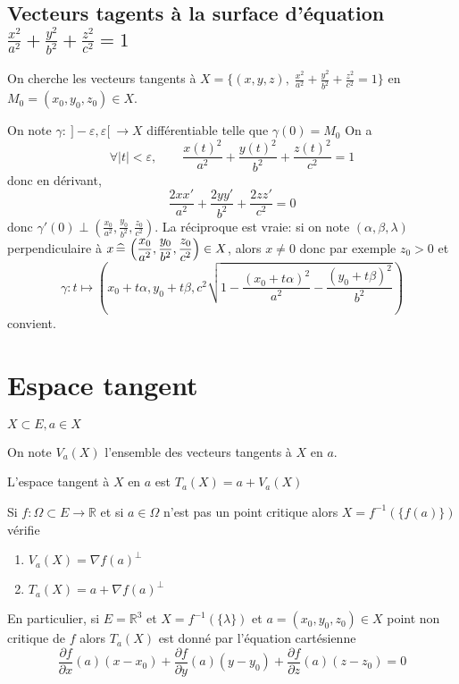 \subsection{Vecteurs tagents à la surface d'équation $\frac{x^2}{a^2}+\frac{y^2}{b^2}+\frac{z^2}{c^2}=1$}

On cherche les vecteurs tangents à $X=\{(x, y, z), \; \frac{x^2}{a^2}+\frac{y^2}{b^2}+\frac{z^2}{c^2}=1\}$ en $M_0=(x_0,y_0,z_0)\in X$.

On note $\gamma :~]-\varepsilon, \varepsilon[ ~\longrightarrow X$ différentiable telle que $\gamma(0)=M_0$
On a \[
    \forall |t|<\varepsilon, \qquad \frac{x(t)^2}{a^2} + \frac{y(t)^2}{b^2} + \frac{z(t)^2}{c^2}=1
\]
donc en dérivant, \[
    \frac{2xx'}{a^2}+ \frac{2yy'}{b^2} + \frac{2zz'}{c^2} =0
\]
donc $\displaystyle\gamma'(0)\perp \left( \frac{x_0}{a^2}, \frac{y_0}{b^2} , \frac{z_0}{c^2}   \right)$. La réciproque est vraie: si on note $(\alpha, \beta, \lambda)$ perpendiculaire à $\displaystyle x\,\widehat=\,\left( \frac{x_0}{a^2}, \frac{y_0}{b^2} , \frac{z_0}{c^2}   \right)\in X$, alors $x\neq 0$ donc par exemple $z_0>0$ et \[
    \gamma:t\longmapsto \left(x_0+t\alpha, y_0+t\beta, c^2\sqrt{1- \dfrac{(x_0+t\alpha)^2}{a^2}-\dfrac{(y_0+t\beta)^2}{b^2}}\right)
\]
convient.

\section{Espace tangent}

\begin{defprop}
    \Hyp $X\subset E, a\in X$
    \begin{concenum}
    \item On note $V_a(X)$ l'ensemble des vecteurs tangents à $X$ en $a$.
    \item L'espace tangent à $X$ en $a$ est $T_a(X)=a+V_a(X)$
    \item Si $f:\Omega \subset E\to \mathbb R$ et si $a\in \Omega$ n'est pas un point critique alors $X=f^{-1}(\{f(a)\})$ vérifie \begin{enumerate}
        \item $V_a(X)=\nabla f(a)^\perp$
        \item $T_a(X)=a+\nabla f(a)^\perp$
    \end{enumerate}
    En particulier, si $E=\mathbb R^3$ et $X=f^{-1}(\{\lambda\})$ et $a=(x_0, y_0, z_0)\in X$ point non critique de $f$ alors $T_a(X)$ est donné par l'équation cartésienne \[
        \frac{\partial f}{\partial x} (a)(x-x_0)+ \frac{\partial f}{\partial y} (a)(y-y_0)+ \frac{\partial f}{\partial z} (a)(z-z_0)=0
    \]
    \end{concenum}
\end{defprop}

